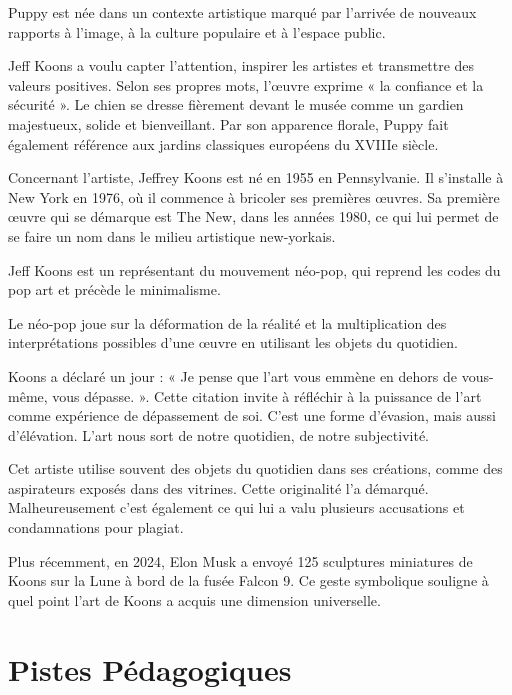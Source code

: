 \documentclass[12pt]{article}
\begin{document}
Puppy est née dans un contexte artistique marqué par l’arrivée de nouveaux rapports à l’image, à la culture populaire et à l’espace public.

Jeff Koons a voulu capter l’attention, inspirer les artistes et transmettre des valeurs positives. Selon ses propres mots, l’œuvre exprime « la confiance et la sécurité ». Le chien se dresse fièrement devant le musée comme un gardien majestueux, solide et bienveillant. Par son apparence florale, Puppy fait également référence aux jardins classiques européens du XVIIIe siècle.

Concernant l’artiste, Jeffrey Koons est né en 1955 en Pennsylvanie. Il s’installe à New York en 1976, où il commence à bricoler ses premières œuvres. Sa première œuvre qui se démarque est The New, dans les années 1980, ce qui lui permet de se faire un nom dans le milieu artistique new-yorkais. 

Jeff Koons est un représentant du mouvement néo-pop, qui reprend les codes du pop art et précède le minimalisme. 


Le néo-pop joue sur la déformation de la réalité et la multiplication des interprétations possibles d’une œuvre en utilisant les objets du quotidien.

Koons a déclaré un jour : « Je pense que l’art vous emmène en dehors de vous-même, vous dépasse. ». Cette citation invite à réfléchir à la puissance de l’art comme expérience de dépassement de soi. C’est une forme d’évasion, mais aussi d’élévation. L’art nous sort de notre quotidien, de notre subjectivité.

Cet artiste utilise souvent des objets du quotidien dans ses créations, comme des aspirateurs exposés dans des vitrines. Cette originalité l’a démarqué. Malheureusement c’est également ce qui lui a valu plusieurs accusations et condamnations pour plagiat. 

Plus récemment, en 2024, Elon Musk a envoyé 125 sculptures miniatures de Koons sur la Lune à bord de la fusée Falcon 9. Ce geste symbolique souligne à quel point l’art de Koons a acquis une dimension universelle.


\section{Pistes Pédagogiques}
\end{document}
